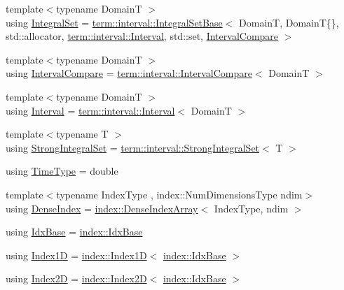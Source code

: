\begin{DoxyCompactItemize}
{\footnotesize template$<$typename DomainT $>$ }\\using \hyperlink{namespacevt_af8fc7210a3d8e598330cf3375857ef1e}{Integral\+Set} = \hyperlink{structvt_1_1term_1_1interval_1_1_integral_set_base}{term\+::interval\+::\+Integral\+Set\+Base}$<$ DomainT, DomainT\{\}, std\+::allocator, \hyperlink{structvt_1_1term_1_1interval_1_1_interval}{term\+::interval\+::\+Interval}, std\+::set, \hyperlink{namespacevt_ab51b754f1d22841f555246195fab9d41}{Interval\+Compare} $>$
\item 
{\footnotesize template$<$typename DomainT $>$ }\\using \hyperlink{namespacevt_ab51b754f1d22841f555246195fab9d41}{Interval\+Compare} = \hyperlink{structvt_1_1term_1_1interval_1_1_interval_compare}{term\+::interval\+::\+Interval\+Compare}$<$ DomainT $>$
\item 
{\footnotesize template$<$typename DomainT $>$ }\\using \hyperlink{namespacevt_a0036b5cb523aef3477d6d5de9d94eabb}{Interval} = \hyperlink{structvt_1_1term_1_1interval_1_1_interval}{term\+::interval\+::\+Interval}$<$ DomainT $>$
\item 
{\footnotesize template$<$typename T $>$ }\\using \hyperlink{namespacevt_aaefb2bd6d08c8dc0ff26ed43636611b1}{Strong\+Integral\+Set} = \hyperlink{structvt_1_1term_1_1interval_1_1_strong_integral_set}{term\+::interval\+::\+Strong\+Integral\+Set}$<$ T $>$
\item 
using \hyperlink{namespacevt_a876a9d0cd5a952859c72de8a46881442}{Time\+Type} = double
\item 
{\footnotesize template$<$typename Index\+Type , index\+::\+Num\+Dimensions\+Type ndim$>$ }\\using \hyperlink{namespacevt_ac016d9c31465ce11c14eab2be11f9183}{Dense\+Index} = \hyperlink{structvt_1_1index_1_1_dense_index_array}{index\+::\+Dense\+Index\+Array}$<$ Index\+Type, ndim $>$
\item 
using \hyperlink{namespacevt_afb96657e28fa98eb685c5e0c6b1b122e}{Idx\+Base} = \hyperlink{namespacevt_1_1index_a0dbb8d47463da27c1436e8e4ddb02743}{index\+::\+Idx\+Base}
\item 
using \hyperlink{namespacevt_a5540efc78234273e1796fb003fe4d234}{Index1D} = \hyperlink{namespacevt_1_1index_a091a4f5a7a2c993d9727eaa60cf67d81}{index\+::\+Index1D}$<$ \hyperlink{namespacevt_1_1index_a0dbb8d47463da27c1436e8e4ddb02743}{index\+::\+Idx\+Base} $>$
\item 
using \hyperlink{namespacevt_a3bab786053b74a3d856fff1412ffa73a}{Index2D} = \hyperlink{namespacevt_1_1index_a8373801efc8343f24d6e8ba57df40a69}{index\+::\+Index2D}$<$ \hyperlink{namespacevt_1_1index_a0dbb8d47463da27c1436e8e4ddb02743}{index\+::\+Idx\+Base} $>$

\end{DoxyCompactItemize}
